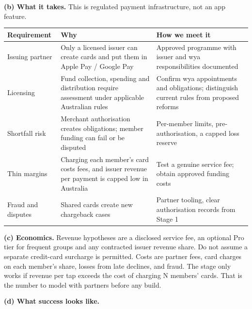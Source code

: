 \documentclass[10pt, a4paper]{report}
\begin{document}
\textbf{(b) What it takes.} This is regulated payment infrastructure, not an app feature.

\vspace{0.2em}
\begin{center}
\footnotesize{}
\begin{tabular}{|>{\centering\arraybackslash}p{3.0cm}|>{\raggedright\arraybackslash}p{7.6cm}|>{\raggedright\arraybackslash}p{6.4cm}|}
\hline
\rowcolor{hdrblue}
\textbf{Requirement} & \textbf{Why} & \textbf{How we meet it} \\
\hline
Issuing partner & Only a licensed issuer can create cards and put them in Apple Pay / Google Pay & Approved programme with issuer and wya responsibilities documented \\
\hline
Licensing & Fund collection, spending and distribution require assessment under applicable Australian rules & Confirm wya appointments and obligations; distinguish current rules from proposed reforms \\
\hline
Shortfall risk & Merchant authorisation creates obligations; member funding can fail or be disputed & Per-member limits, pre-authorisation, a capped loss reserve \\
\hline
Thin margins & Charging each member's card costs fees, and issuer revenue per payment is capped low in Australia & Test a genuine service fee; obtain approved funding costs \\
\hline
Fraud and disputes & Shared cards create new chargeback cases & Partner tooling, clear authorisation records from Stage 1 \\
\hline
\end{tabular}
\end{center}
\normalsize

\textbf{(c) Economics.} Revenue hypotheses are a disclosed service fee, an optional Pro tier for frequent groups and any contracted issuer revenue share. Do not assume a separate credit-card surcharge is permitted. Costs are partner fees, card charges on each member's share, losses from late declines, and fraud. The stage only works if revenue per tap exceeds the cost of charging N members' cards. That is the number to model with partners before any build.

\textbf{(d) What success looks like.}
\end{document}
